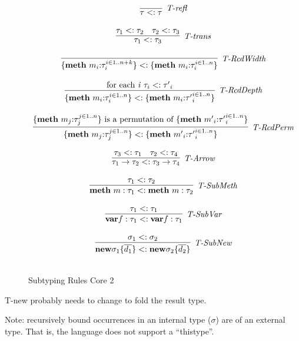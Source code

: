 \begin{figure}
\centering
\[
\begin{array}{c}
\infer[\textit{T-refl}]
	{\tau<:\tau}
	{} \\[3ex]

\infer[\textit{T-trans}]
	{\tau_1<:\tau_3}
	{\tau_1<:\tau_2 & \tau_2<:\tau_3} \\[3ex]	

\infer[\textit{T-RcdWidth}]
	{\{ \keyw{meth}~m_i{:}\tau_i ^{i \in 1..n+k} \} <: \{\keyw{meth}~m_i{:}\tau_i ^{i \in 1..n} \}}
	{}\\[3ex]

\infer[\textit{T-RcdDepth}]
	{\{ \keyw{meth}~m_i{:}\tau_i ^{i \in 1..n} \} <: \{ \keyw{meth}~m_i{:}{\tau'}_i ^{i \in 1..n} \}}
	{\textrm{for each \textit{i}} ~ \tau_i <: {\tau'}_i}\\[3ex]

\infer[\textit{T-RcdPerm}]
	{\{ \keyw{meth}~m_j{:}\tau_j ^{j \in 1..n} \} <: \{ \keyw{meth}~{m'}_i{:}{\tau'}_i ^{i \in 1..n} \}}
	{\{ \keyw{meth}~m_j{:}\tau_j ^{j \in 1..n} \} \textrm{ is a permutation of } \{ \keyw{meth}~{m'}_i{:}{\tau'}_i ^{i \in 1..n} \}}\\[3ex]

\infer[\textit{T-Arrow}]
	{\tau_1 \rightarrow \tau_2 <: \tau_3 \rightarrow \tau_4}
	{\tau_3 <: \tau_1 & \tau_2 <: \tau_4}\\[3ex]

\infer[\textit{T-SubMeth}]
	{\keyw{meth}~m:\tau_1 <: \keyw{meth}~ m:\tau_2}
	{\tau_1 <: \tau_2}\\[3ex]

\infer[\textit{T-SubVar}]
	{\keyw{var} f:\tau_1 <: \keyw{var} f:\tau_1}
	{\tau_1 <: \tau_1}\\[3ex]

\infer[\textit{T-SubNew}]
	{\keyw{new} \sigma_1\{\overline{d_1}\} <: \keyw{new} \sigma_2\{\overline{d_2}\}}
	{\sigma_1 <: \sigma_2}\\[3ex]

\end{array}
\]
\caption{Subtyping Rules Core 2}
\end{figure}


%


T-new probably needs to change to fold the result type.


Note: recursively bound occurrences in an internal type ($\sigma$) are of an external type.  That is, the language does not support a ``thistype''.

